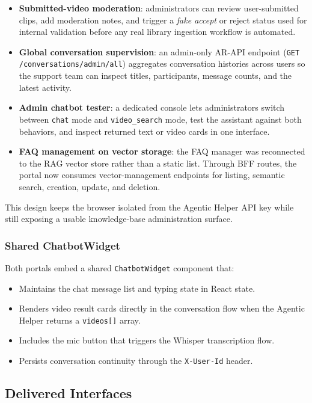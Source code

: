 \begin{itemize}
  \item \textbf{Submitted-video moderation}: administrators can review user-submitted clips,
    add moderation notes, and trigger a \emph{fake accept} or reject status used for internal
    validation before any real library ingestion workflow is automated.
  \item \textbf{Global conversation supervision}: an admin-only AR-API endpoint
    (\texttt{GET /conversations/admin/all}) aggregates conversation histories across users so the
    support team can inspect titles, participants, message counts, and the latest activity.
  \item \textbf{Admin chatbot tester}: a dedicated console lets administrators switch between
    \texttt{chat} mode and \texttt{video\_search} mode, test the assistant against both
    behaviors, and inspect returned text or video cards in one interface.
  \item \textbf{FAQ management on vector storage}: the FAQ manager was reconnected to the RAG
    vector store rather than a static list. Through BFF routes, the portal now consumes
    vector-management endpoints for listing, semantic search, creation, update, and deletion.
\end{itemize}

This design keeps the browser isolated from the Agentic Helper API key while still exposing a
usable knowledge-base administration surface.

\subsubsection{Shared ChatbotWidget}

Both portals embed a shared \texttt{ChatbotWidget} component that:
\begin{itemize}
  \item Maintains the chat message list and typing state in React state.
  \item Renders video result cards directly in the conversation flow when the Agentic Helper
    returns a \texttt{videos[]} array.
  \item Includes the mic button that triggers the Whisper transcription flow.
  \item Persists conversation continuity through the \texttt{X-User-Id} header.
\end{itemize}

\subsection{Delivered Interfaces}

